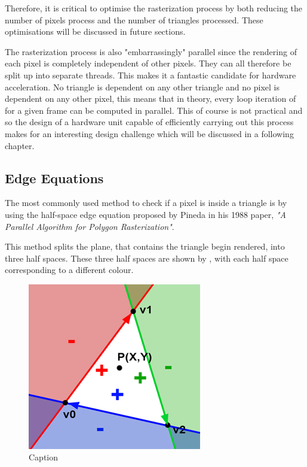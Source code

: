 Therefore, it is critical to optimise the rasterization process by both reducing the number of pixels process and the number of triangles processed. These optimisations will be discussed in future sections.

The rasterization process is also "embarrassingly" parallel\cite{embarassinglyParallel} since the rendering of each pixel is completely independent of other pixels. They can all therefore be split up into separate threads.
This makes it a fantastic candidate for hardware acceleration. No triangle is dependent on any other triangle and no pixel is dependent on any other pixel, this means that in theory, every loop iteration of  for a given frame can be computed in parallel. This of course is not practical and so the design of a hardware unit capable of efficiently carrying out this process makes for an interesting design challenge which will be discussed in a following chapter.

\subsection{Edge Equations}
The most commonly used method to check if a pixel is inside a triangle is by using the half-space edge equation proposed by Pineda in his 1988 paper, \textit{"A Parallel Algorithm for Polygon Rasterization"}\cite{PinedaEdgeEquation}. 

This method splits the plane, that contains the triangle begin rendered, into three half spaces. These three half spaces are shown by , with each half space corresponding to a different colour. 


\begin{figure}[ht]
    \centering
    \includegraphics{lit_review/images/EdgeFunctionTriangle.png}
    \caption{Caption\cite{ScratchPixelRasterStage}}
    \label{fig:edgeFunctionTriangle}
\end{figure}

